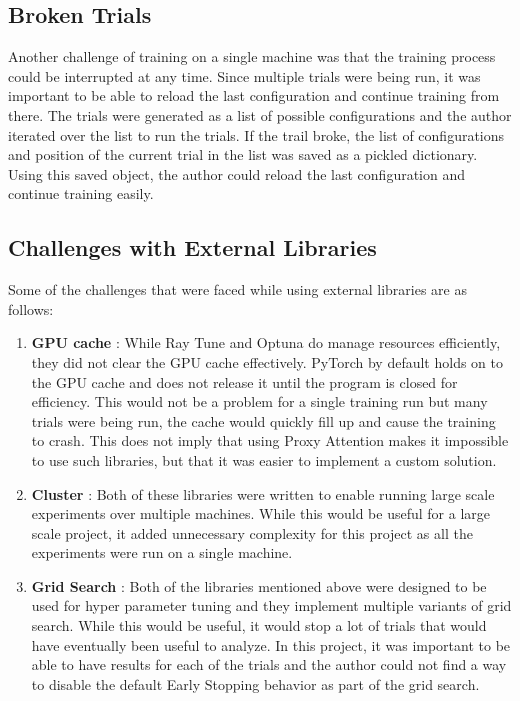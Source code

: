 \subsection{Broken Trials}
Another challenge of training on a single machine was that the training process could be interrupted at any time. Since multiple trials were being run, it was important to be able to reload the last configuration and continue training from there. The trials were generated as a list of possible configurations and the author iterated over the list to run the trials. If the trail broke, the list of configurations and position of the current trial in the list was saved as a pickled dictionary. Using this saved object, the author could reload the last configuration and continue training easily.

\subsection{Challenges with External Libraries} \label{sec:challenges_with_external_libraries}
Some of the challenges that were faced while using external libraries are as follows:
\begin{enumerate}
    \item \textbf{GPU cache} : While Ray Tune and Optuna do manage resources efficiently, they did not clear the GPU cache effectively. PyTorch by default holds on to the GPU cache and does not release it until the program is closed for efficiency. This would not be a problem for a single training run but many trials were being run, the cache would quickly fill up and cause the training to crash. This does not imply that using Proxy Attention makes it impossible to use such libraries, but that it was easier to implement a custom solution.
    \item \textbf{Cluster} : Both of these libraries were written to enable running large scale experiments over multiple machines. While this would be useful for a large scale project, it added unnecessary complexity for this project as all the experiments were run on a single machine.
    \item \textbf{Grid Search} : Both of the libraries mentioned above were designed to be used for hyper parameter tuning and they implement multiple variants of grid search. While this would be useful, it would stop a lot of trials that would have eventually been useful to analyze. In this project, it was important to be able to have results for each of the trials and the author could not find a way to disable the default Early Stopping behavior as part of the grid search.
\end{enumerate}

